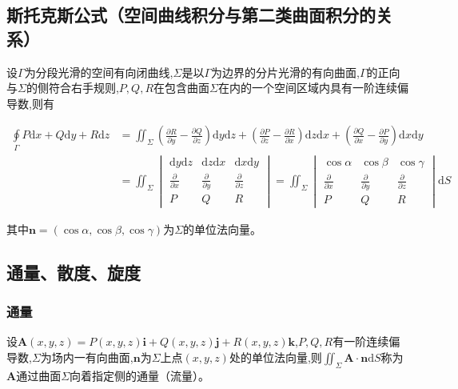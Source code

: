 \documentclass[UTF8]{ctexart}
\theoremstyle{remark}
\begin{document}
	\subsection{斯托克斯公式（空间曲线积分与第二类曲面积分的关系）}
	设\(\Gamma\)为分段光滑的空间有向闭曲线,\(\Sigma\)是以\(\Gamma\)为边界的分片光滑的有向曲面,\(\Gamma\)的正向与\(\Sigma\)的侧符合右手规则,\(P,Q,R\)在包含曲面\(\Sigma\)在内的一个空间区域内具有一阶连续偏导数,则有
	
	\begin{align*}
		\underset{\Gamma}{\oint} P \mathrm{d}x + Q \mathrm{d}y + R \mathrm{d}z &= \iint_{\Sigma} \left( \frac{\partial R}{\partial y} - \frac{\partial Q}{\partial z} \right) \mathrm{d}y \mathrm{d}z + \left( \frac{\partial P}{\partial z} - \frac{\partial R}{\partial x} \right) \mathrm{d}z \mathrm{d}x + \left( \frac{\partial Q}{\partial x} - \frac{\partial P}{\partial y} \right) \mathrm{d}x \mathrm{d}y \\
		&= \iint_{\Sigma} 
		\begin{vmatrix}
			\mathrm{d}y \mathrm{d}z & \mathrm{d}z \mathrm{d}x & \mathrm{d}x \mathrm{d}y \\
			\frac{\partial}{\partial x} & \frac{\partial}{\partial y} & \frac{\partial}{\partial z} \\
			P & Q & R
		\end{vmatrix}
		= \iint_{\Sigma} 
		\begin{vmatrix}
			\cos\alpha & \cos\beta & \cos\gamma \\
			\frac{\partial}{\partial x} & \frac{\partial}{\partial y} & \frac{\partial}{\partial z} \\
			P & Q & R
		\end{vmatrix}
		\mathrm{d}S
	\end{align*}
	
	其中\(\boldsymbol{n} = (\cos\alpha,\cos\beta,\cos\gamma)\)为\(\Sigma\)的单位法向量。
	
	\subsection{通量、散度、旋度}
	\subsubsection{通量}
	设\(\boldsymbol{A}(x,y,z) = P(x,y,z)\boldsymbol{i} + Q(x,y,z)\boldsymbol{j} + R(x,y,z)\boldsymbol{k}\),\(P,Q,R\)有一阶连续偏导数,\(\Sigma\)为场内一有向曲面,\(\boldsymbol{n}\)为\(\Sigma\)上点\((x,y,z)\)处的单位法向量,则\(\iint_{\Sigma} \boldsymbol{A} \cdot \boldsymbol{n} \mathrm{d}S\)称为\(\boldsymbol{A}\)通过曲面\(\Sigma\)向着指定侧的通量（流量）。
	
\end{document}
